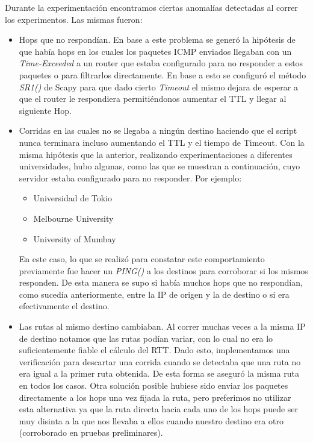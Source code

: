 Durante la experimentación encontramos ciertas anomalías detectadas al correr los experimentos. Las mismas fueron:

\begin{itemize}
    \item Hops que no respondían. En base a este problema se generó la hipótesis de que había hops en los cuales los paquetes ICMP enviados llegaban con un \textit{Time-Exceeded} a un router que estaba configurado para no responder a estos paquetes o para filtrarlos directamente. En base a esto se configuró el método \textit{SR1()} de Scapy para que dado cierto \textit{Timeout} el mismo dejara de esperar a que el router le respondiera permitiéndonos aumentar el TTL y llegar al siguiente Hop.
    
    \item Corridas en las cuales no se llegaba a ningún destino haciendo que el script nunca terminara incluso aumentando el TTL y el tiempo de Timeout. Con la misma hipótesis que la anterior, realizando experimentaciones a diferentes universidades, hubo algunas, como las que se muestran a continuación, cuyo servidor estaba configurado para no responder. Por ejemplo:
    \begin{itemize}
        \item Universidad de Tokio
        \item Melbourne University
        \item University of Mumbay
    \end{itemize}
    En este caso, lo que se realizó para constatar este comportamiento previamente fue hacer un \textit{PING()} a los destinos para corroborar si los mismos responden. De esta manera se supo si había muchos hops que no respondían, como sucedía anteriormente, entre la IP de origen y la de destino o si era efectivamente el destino.

    \item Las rutas al mismo destino cambiaban. Al correr muchas veces a la misma IP de destino notamos que las rutas podían variar, con lo cual no era lo suficientemente fiable el cálculo del RTT. Dado esto, implementamos una verificación para descartar una corrida cuando se detectaba que una ruta no era igual a la primer ruta obtenida. De esta forma se aseguró la misma ruta en todos los casos. Otra solución posible hubiese sido enviar los paquetes directamente a los hops una vez fijada la ruta, pero preferimos no utilizar esta alternativa ya que la ruta directa hacia cada uno de los hops puede ser muy disinta a la que nos llevaba a ellos cuando nuestro destino era otro (corroborado en pruebas preliminares).
    

\end{itemize}
